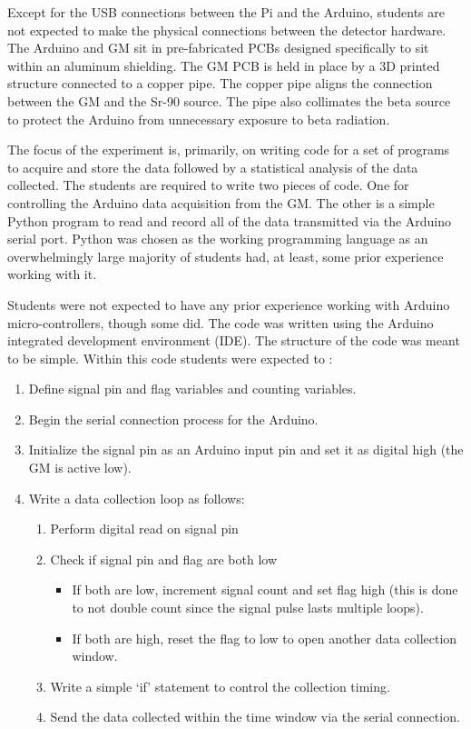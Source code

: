 Except for the USB connections between the Pi and the Arduino, students are not expected to make the physical connections between the detector hardware.
The Arduino and GM sit in pre-fabricated PCBs designed specifically to sit within an aluminum shielding.
The GM PCB is held in place by a 3D printed structure connected to a copper pipe.
The copper pipe aligns the connection between the GM and the Sr-90 source.
The pipe also collimates the beta source to protect the Arduino from unnecessary exposure to beta radiation.

The focus of the experiment is, primarily, on writing code for a set of programs to acquire and store the data followed by a statistical analysis of the data collected.
The students are required to write two pieces of code.
One for controlling the Arduino data acquisition from the GM.
The other is a simple Python program to read and record all of the data transmitted via the Arduino serial port.
Python was chosen as the working programming language as an overwhelmingly large majority of students had, at least, some prior experience working with it.

Students were not expected to have any prior experience working with Arduino micro-controllers, though some did.
The code was written using the Arduino integrated development environment (IDE).
The structure of the code was meant to be simple.
Within this code students were expected to :

\begin{enumerate}
\item Define signal pin and flag variables and counting variables.
\item Begin the serial connection process for the Arduino.
\item Initialize the signal pin as an Arduino input pin and set it as digital high (the GM is active low).
\item Write a data collection loop as follows:
  \begin{enumerate}
  \item Perform digital read on signal pin
  \item Check if signal pin and flag are both low
    \begin{itemize}
    \item If both are low, increment signal count and set flag high (this is done to not double count since the signal pulse lasts multiple loops).
    \item If both are high, reset the flag to low to open another data collection window.
    \end{itemize}
  \item Write a simple `if' statement to control the collection timing.
  \item Send the data collected within the time window via the serial connection.
  \end{enumerate}
  
      
\end{enumerate}

